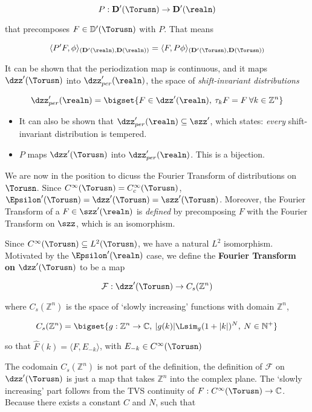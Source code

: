 \[
P: \mathbf{D}'(\Torusn)\to \mathbf{D}'(\realn)
\]

that precomposes \(F\in \mathbb{D}'(\Torusn)\) with \(P\). That means

\[
\langle P'F,\phi \rangle_{(\mathbf{D}'(\realn), \mathbf{D}(\realn))} = \langle F, P\phi\rangle_{(\mathbf{D}'(\Torusn), \mathbf{D}(\Torusn))}
\]

It can be shown that the periodization map is continuous, and it maps
\(\dzz'(\Torusn)\) into \(\dzz'_{per}(\realn)\), the space of
\emph{shift-invariant distributions}

\[
\dzz'_{per}(\realn) = \bigset{F\in\dzz'(\realn),\: \tau_kF = F\: \forall k\in\mathbb{Z}^n}
\]

\begin{itemize}
\tightlist
\item
  It can also be shown that \(\dzz'_{per}(\realn)\subseteq\szz'\), which
  states: \emph{every} shift-invariant distribution is tempered.
\item
  \(P\) maps \(\dzz'(\Torusn)\) into \(\dzz'_{per}(\realn)\). This is a
  bijection.
\end{itemize}

We are now in the position to dicuss the Fourier Transform of
distributions on \(\Torusn\). Since
\(C^\infty(\Torusn) = C_c^\infty(\Torusn)\),
\(\Epsilon'(\Torusn) = \dzz'(\Torusn) = \szz'(\Torusn)\). Moreover, the
Fourier Transform of a \(F\in\szz'(\realn)\) is \emph{defined} by
precomposing \(F\) with the Fourier Transform on \(\szz\), which is an
isomorphism.

Since \(C^\infty(\Torusn)\subseteq L^2(\Torusn)\), we have a natural
\(L^2\) isomorphism. Motivated by the \(\Epsilon'(\realn)\) case, we
define the \textbf{Fourier Transform on \(\dzz'(\Torusn)\)} to be a map

\[
\mathcal{F}: \dzz'(\Torusn)\to C_s(\mathbb{Z}^n)
\]

where \(C_s(\mathbb{Z}^n)\) is the space of `slowly increasing'
functions with domain \(\mathbb{Z}^n\),

\[
C_s(\mathbb{Z}^n) = \bigset{g: \mathbb{Z}^n\to\mathbb{C},\: \vert g(k)\vert\Lsim_{g}(1+\vert k\vert)^{N},\:N\in\mathbb{N}^+}
\]

so that \(\hat{F}(k) = \langle F, E_{-k}\rangle\), with
\(E_{-k}\in C^\infty(\Torusn)\)

The codomain \(C_s(\mathbb{Z}^n)\) is not part of the definition, the
definition of \(\mathcal{F}\) on \(\dzz'(\Torusn)\) is just a map that
takes \(\mathbb{Z}^n\) into the complex plane. The `slowly increasing'
part follows from the TVS continuity of
\(F: C^\infty(\Torusn)\to\mathbb{C}\). Because there exists a constant
\(C\) and \(N\), such that

